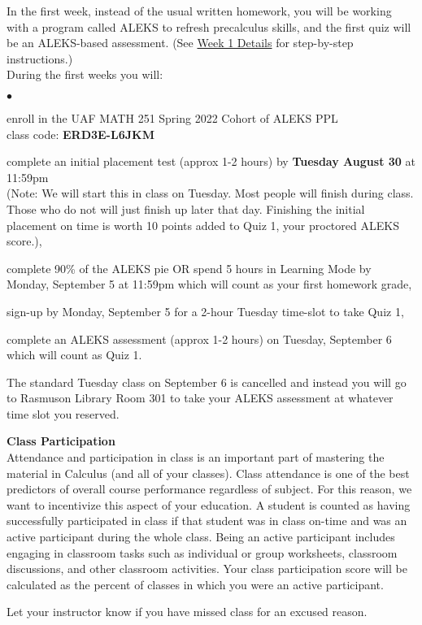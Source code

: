 \documentclass[12pt]{article}
\renewcommand{\emph}[1]{\textsf{\textbf{#1}}}
\newcommand{\localhead}[1]{\par\smallskip\textbf{#1}\nobreak\\}%
\def\heading#1{\localhead{\large\emph{#1}}}
\newenvironment{clist}%
{\bgroup\parskip 0pt\begin{list}{$\bullet$}{\partopsep 4pt\topsep 0pt\itemsep -2pt}}%
{\end{list}\egroup}%
\begin{document}
In the first week, instead of the usual written homework, you will be
working with a program called ALEKS to refresh precalculus skills, and the first
quiz will be an ALEKS-based assessment. (See \href{https://uaf-math251.github.io/week1-ALEKS.html}{Week 1 Details} for step-by-step instructions.)\\ 
During the first weeks you will:
\begin{clist}
\item enroll in the UAF MATH 251 Spring 2022 Cohort of ALEKS PPL\\
class code: \textbf{ERD3E-L6JKM}
\item complete an initial placement test (approx 1-2 hours) by \textbf{Tuesday August 30} at 11:59pm \\
(Note: We will start this in class on Tuesday. Most people will finish during class. Those who do not will just finish up later that day. Finishing the initial placement on time is worth 10 points added to Quiz 1, your proctored ALEKS score.),
\item complete 90\% of the ALEKS pie \: OR \: spend 5 hours in Learning Mode by Monday, September 5 at 11:59pm which will count as your first homework grade,
\item sign-up by Monday, September 5 for a 2-hour Tuesday time-slot to take Quiz 1, 
\item complete an ALEKS assessment (approx 1-2 hours) on Tuesday, September 6 which will count as Quiz 1.
\end{clist}
The standard Tuesday class on September 6 is cancelled and instead you will go to Rasmuson Library Room 301 to take your ALEKS assessment at whatever time slot you reserved. 

\heading{Class Participation}
Attendance and participation in class is an important part of mastering the material in Calculus (and all of your classes). Class attendance is one of the best predictors of overall course performance regardless of subject. For this reason, we want to incentivize this aspect of your education. A student is counted as having successfully participated in class if that student was in class on-time and was an active participant during the whole class. Being an active participant includes engaging in classroom tasks such as individual or group worksheets, classroom discussions, and other classroom activities. Your class participation score will be calculated as the percent of classes in which you were an active participant. 

Let your instructor know if you have missed class for an excused reason.
\end{document}

